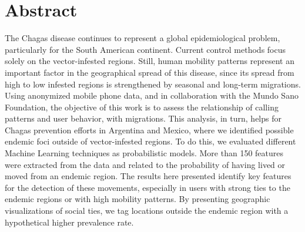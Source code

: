 \chapter{Abstract}
\label{cha:abstract}

The Chagas disease continues to represent a global epidemiological problem, particularly for the South American continent.
Current control methods focus solely on the vector-infested regions. 
Still, human mobility patterns represent an important factor in the geographical spread of this disease, since its spread from high to low infested regions is strengthened by seasonal and long-term migrations. 
Using anonymized mobile phone data, and in collaboration with the Mundo Sano Foundation, the objective of this work is to assess the relationship of calling patterns and user behavior, with migrations. 
This analysis, in turn, helps for Chagas prevention efforts in Argentina and Mexico, where we identified possible endemic foci outside of vector-infested regions. 
To do this, we evaluated different Machine Learning techniques as probabilistic models. 
More than 150 features were extracted from the data and related to the probability of having lived or moved from an endemic region. 
The results here presented identify key features for the detection of these movements, especially in users with strong ties to the endemic regions or with high mobility patterns. 
By presenting geographic visualizations of social ties, we tag locations outside the endemic region with a hypothetical higher prevalence rate.
